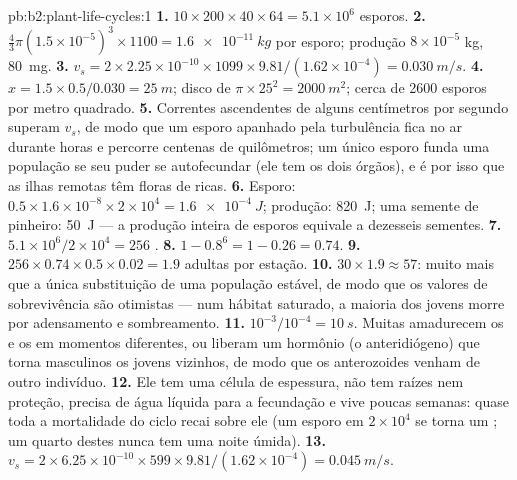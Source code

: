 \begin{solution}{pb:b2:plant-life-cycles:1}
\textbf{1.} $10\times 200\times 40\times 64 = 5.1\times 10^{6}$
esporos.
\textbf{2.} $\tfrac43\pi(1.5\times 10^{-5})^3\times 1100 =
\qty{1.6e-11}{kg}$ por esporo; produção $8\times 10^{-5}$ kg,
\qty{80}{mg}.
\textbf{3.} $v_s = 2\times 2.25\times 10^{-10}\times 1099\times
9.81/(1.62\times 10^{-4}) = \qty{0.030}{m/s}$.
\textbf{4.} $x = 1.5\times 0.5/0.030 = \qty{25}{m}$; disco de
$\pi\times 25^2 = \qty{2000}{m^2}$; cerca de \num{2600} esporos por
metro quadrado.
\textbf{5.} Correntes ascendentes de alguns centímetros por segundo
superam $v_s$, de modo que um esporo apanhado pela turbulência fica no
ar durante horas e percorre centenas de quilômetros; um único esporo
funda uma população se seu  puder se autofecundar (ele tem os
dois órgãos), e é por isso que as ilhas remotas têm floras de
 ricas.
\textbf{6.} Esporo: $0.5\times 1.6\times 10^{-8}\times 2\times 10^{4} =
\qty{1.6e-4}{J}$; produção: \qty{820}{J}; uma semente de pinheiro:
\qty{50}{J} --- a produção inteira de esporos equivale a dezesseis
sementes.
\textbf{7.} $5.1\times 10^{6}/2\times 10^{4} = 256$ .
\textbf{8.} $1 - 0.8^{6} = 1 - 0.26 = 0.74$.
\textbf{9.} $256\times 0.74\times 0.5\times 0.02 = 1.9$ 
adultas por estação.
\textbf{10.} $30\times 1.9 \approx 57$: muito mais que a única
substituição de uma população estável, de modo que os valores de
sobrevivência são otimistas --- num hábitat saturado, a maioria dos
 jovens morre por adensamento e sombreamento.
\textbf{11.} $10^{-3}/10^{-4} = \qty{10}{s}$. Muitas 
amadurecem os  e os  em momentos diferentes, ou
liberam um hormônio (o anteridiógeno) que torna masculinos os 
jovens vizinhos, de modo que os anterozoides venham de outro
indivíduo.
\textbf{12.} Ele tem uma célula de espessura, não tem raízes nem
proteção, precisa de água líquida para a fecundação e vive poucas
semanas: quase toda a mortalidade do ciclo recai sobre ele (um esporo
em $2\times 10^{4}$ se torna um ; um quarto destes nunca tem
uma noite úmida).
\textbf{13.} $v_s = 2\times 6.25\times 10^{-10}\times 599\times
9.81/(1.62\times 10^{-4}) = \qty{0.045}{m/s}$.

\end{solution}
